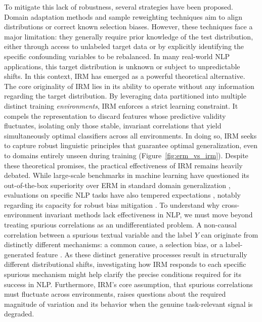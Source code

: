 \documentclass[11pt]{article}
\theoremstyle{definition}
\theoremstyle{plain}
\begin{document}
To mitigate this lack of robustness, several strategies have been proposed. Domain adaptation methods \citep{ben-david2010theory, ganin2016domain} and sample reweighting techniques \citep{shimodaira2000improving} aim to align distributions or correct known selection biases. However, these techniques face a major limitation: they generally require prior knowledge of the test distribution, either through access to unlabeled target data or by explicitly identifying the specific confounding variables to be rebalanced. In many real-world NLP applications, this target distribution is unknown or subject to unpredictable shifts. In this context, IRM \citep{arjovsky2019invariant} has emerged as a powerful theoretical alternative. The core originality of IRM lies in its ability to operate without any information regarding the target distribution. By leveraging data partitioned into multiple distinct training \emph{environments}, IRM enforces a strict learning constraint. It compels the representation to discard features whose predictive validity fluctuates, isolating only those stable, invariant correlations that yield simultaneously optimal classifiers across all environments. In doing so, IRM seeks to capture robust linguistic principles that guarantee optimal generalization, even to domains entirely unseen during training (Figure~\ref{fig:erm_vs_irm}). Despite these theoretical promises, the practical effectiveness of IRM remains heavily debated. While large-scale benchmarks in machine learning have questioned its out-of-the-box superiority over ERM in standard domain generalization \citep{gulrajani2020search}, evaluations on specific NLP tasks have also tempered expectations \citep{koh2021wilds}, notably regarding its capacity for robust bias mitigation \citep{dranker2021irm}. To understand why cross-environment invariant methods lack effectiveness in NLP, we must move beyond treating spurious correlations as an undifferentiated problem. A non-causal correlation between a spurious textual variable and the label $Y$ can originate from distinctly different mechanisms: a common cause, a selection bias, or a label-generated feature \citep{pearl2009causality}. As these distinct generative processes result in structurally different distributional shifts, investigating how IRM responds to each specific spurious mechanism might help clarify the precise conditions required for its success in NLP. Furthermore, IRM's core assumption, that spurious correlations must fluctuate across environments, raises questions about the required magnitude of variation and its behavior when the genuine task-relevant signal is degraded.
\end{document}
